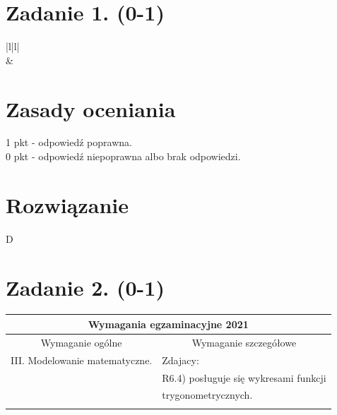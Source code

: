\documentclass[10pt]{article}
\begin{document}
\section*{Zadanie 1. (0-1)}
\begin{center}
\begin{tabular}{|l|l|}
\hline
{} \\
\hline
{} &  \\
\hline
\end{tabular}
\end{center}

\section*{Zasady oceniania}
1 pkt - odpowiedź poprawna.\\
0 pkt - odpowiedź niepoprawna albo brak odpowiedzi.

\section*{Rozwiązanie}
D

\section*{Zadanie 2. (0-1)}
\begin{center}
\begin{tabular}{|l|l|}
\hline
\multicolumn{2}{|c|}{Wymagania egzaminacyjne 2021} \\
\hline
\multicolumn{1}{|c|}{Wymaganie ogólne} & \multicolumn{1}{c|}{Wymaganie szczegółowe} \\
\hline
III. Modelowanie matematyczne. & Zdajacy: \\
 & R6.4) posługuje się wykresami funkcji \\
 & trygonometrycznych. \\
 &  \\
\hline
\end{tabular}
\end{center}
\end{document}
